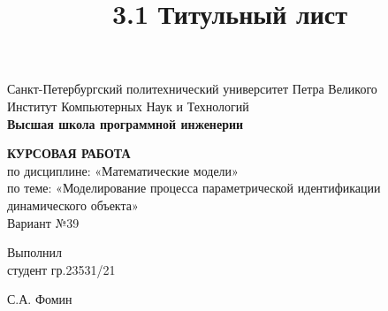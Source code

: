 \documentclass[a4paper, 12pt]{article}
\title{3.1 Титульный лист}
\begin{document}



\thispagestyle{empty}

\begin{center}
    Санкт-Петербургский политехнический университет Петра Великого\\
    Институт Компьютерных Наук и Технологий\\
    \bfseries{Высшая школа программной инженерии}
\end{center}

\vspace{20ex}

\begin{center}
    {
    \LARGE \textbf{КУРСОВАЯ РАБОТА} \\[3ex]
    по дисциплине: «Математические модели» \\
    по теме: «Моделирование процесса параметрической идентификации динамического объекта» \\[3ex]
    Вариант №39
    }
\end{center}

\vspace{40ex}

\noindent Выполнил\\
студент гр.23531/21\hfill
\begin{minipage}{0.7\textwidth}
    \hfill \uline{\hspace{3cm}} \hspace{1.1cm} С.А. Фомин
\end{minipage}

\vspace{3ex}
\end{document}
